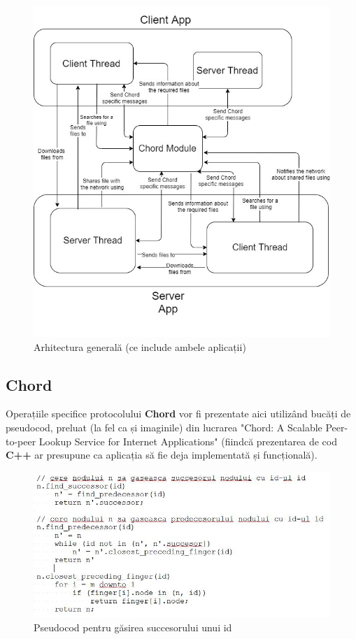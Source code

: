 \documentclass[runningheads]{llncs}
\begin{document}
\begin{figure}[!h]
	\centering
	\includegraphics[width=12cm]{architecture.jpg}
	\caption{Arhitectura generală (ce include ambele aplicații)}
\end{figure}

\subsection{Chord}

Operațiile specifice protocolului \textbf{Chord} vor fi prezentate aici utilizând bucăți de pseudocod, preluat (la fel ca și imaginile) din lucrarea "Chord: A Scalable Peer-to-peer Lookup Service for Internet Applications" \cite{ChordArticle} (fiindcă prezentarea de cod \textbf{C++} ar presupune ca aplicația să fie deja implementată și funcțională).

\begin{figure}[!h]
	\centering
	\includegraphics[width=14cm]{succesor.jpg}
	\caption{Pseudocod pentru găsirea succesorului unui id}
\end{figure}
\end{document}
